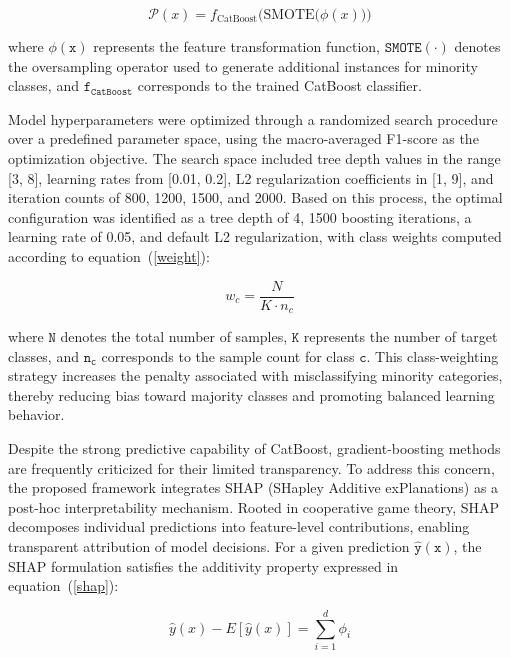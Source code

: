 \documentclass[conference]{IEEEtran}
\begin{document}
\begin{equation}
\label{catboost}
    \mathcal{P}(x) = f_{\text{CatBoost}} \Big( \text{SMOTE} \big( \phi(x) \big) \Big)
\end{equation}

where $\mathtt{\phi(x)}$ represents the feature transformation function, $\mathtt{SMOTE(\cdot)}$ denotes the oversampling operator used to generate additional instances for minority classes, and $\mathtt{f_{CatBoost}}$ corresponds to the trained CatBoost classifier.

Model hyperparameters were optimized through a randomized search procedure over a predefined parameter space, using the macro-averaged F1-score as the optimization objective. The search space included tree depth values in the range [3, 8], learning rates from [0.01, 0.2], L2 regularization coefficients in [1, 9], and iteration counts of 800, 1200, 1500, and 2000. Based on this process, the optimal configuration was identified as a tree depth of 4, 1500 boosting iterations, a learning rate of 0.05, and default L2 regularization, with class weights computed according to equation~(\ref{weight}):


\begin{equation}
\label{weight}
    w_c = \frac{N}{K \cdot n_c}
\end{equation}

where $\mathtt{N}$ denotes the total number of samples, $\mathtt{K}$ represents the number of target classes, and $\mathtt{n_c}$ corresponds to the sample count for class $\mathtt{c}$. This class-weighting strategy increases the penalty associated with misclassifying minority categories, thereby reducing bias toward majority classes and promoting balanced learning behavior.

Despite the strong predictive capability of CatBoost, gradient-boosting methods are frequently criticized for their limited transparency. To address this concern, the proposed framework integrates SHAP (SHapley Additive exPlanations) as a post-hoc interpretability mechanism. Rooted in cooperative game theory, SHAP decomposes individual predictions into feature-level contributions, enabling transparent attribution of model decisions. For a given prediction $\mathtt{\hat{y}(x)}$, the SHAP formulation satisfies the additivity property expressed in equation~(\ref{shap}):


\begin{equation}
\label{shap}
    \hat{y}(x) - E[\hat{y}(x)] = \sum_{i=1}^{d} \phi_i
\end{equation}
\end{document}
